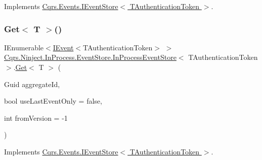 Implements \hyperlink{interfaceCqrs_1_1Events_1_1IEventStore_af398bb6768fa661ad97a9fa9ecfbd9fb_af398bb6768fa661ad97a9fa9ecfbd9fb}{Cqrs.\+Events.\+I\+Event\+Store$<$ T\+Authentication\+Token $>$}.

\mbox{\label{classCqrs_1_1Ninject_1_1InProcess_1_1EventStore_1_1InProcessEventStore_a154f3f96109d63a3bf442a72c1bb0525_a154f3f96109d63a3bf442a72c1bb0525}} 
\subsubsection{\texorpdfstring{Get$<$ T $>$()}{Get< T >()}}
{\footnotesize\ttfamily I\+Enumerable$<$\hyperlink{interfaceCqrs_1_1Events_1_1IEvent}{I\+Event}$<$T\+Authentication\+Token$>$ $>$ \hyperlink{classCqrs_1_1Ninject_1_1InProcess_1_1EventStore_1_1InProcessEventStore}{Cqrs.\+Ninject.\+In\+Process.\+Event\+Store.\+In\+Process\+Event\+Store}$<$ T\+Authentication\+Token $>$.\hyperlink{classCqrs_1_1Ninject_1_1InProcess_1_1EventStore_1_1InProcessEventStore_a45144027681fe901b1f0db3de9dc7b21_a45144027681fe901b1f0db3de9dc7b21}{Get}$<$ T $>$ (\begin{DoxyParamCaption}\item[{Guid}]{aggregate\+Id,  }\item[{bool}]{use\+Last\+Event\+Only = {\ttfamily false},  }\item[{int}]{from\+Version = {\ttfamily -\/1} }\end{DoxyParamCaption})}



Implements \hyperlink{interfaceCqrs_1_1Events_1_1IEventStore_add6227e2978ff8656aad79b1a51bf34c_add6227e2978ff8656aad79b1a51bf34c}{Cqrs.\+Events.\+I\+Event\+Store$<$ T\+Authentication\+Token $>$}.

\mbox{\label{classCqrs_1_1Ninject_1_1InProcess_1_1EventStore_1_1InProcessEventStore_a21816423f7b71249f3dc7ce14952e1e5_a21816423f7b71249f3dc7ce14952e1e5}} 
